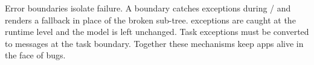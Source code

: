 \begin{recap}
Error boundaries isolate failure. A boundary catches exceptions
during / and renders a fallback in place
of the broken sub-tree.  exceptions are caught at
the runtime level and the model is left unchanged. Task
exceptions must be converted to messages at the task boundary.
Together these mechanisms keep \maya{} apps alive in the face of
bugs.
\end{recap}
